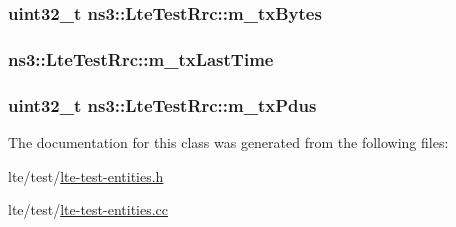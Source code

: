 \subsubsection[{\texorpdfstring{m\+\_\+tx\+Bytes}{m_txBytes}}]{\setlength{\rightskip}{0pt plus 5cm}uint32\+\_\+t ns3\+::\+Lte\+Test\+Rrc\+::m\+\_\+tx\+Bytes\hspace{0.3cm}{\ttfamily [private]}}\hypertarget{classns3_1_1LteTestRrc_a3dc28e3aafa754182994ee88852d4ee3}{}\label{classns3_1_1LteTestRrc_a3dc28e3aafa754182994ee88852d4ee3}
\subsubsection[{\texorpdfstring{m\+\_\+tx\+Last\+Time}{m_txLastTime}}]{ ns3\+::\+Lte\+Test\+Rrc\+::m\+\_\+tx\+Last\+Time\hspace{0.3cm}{\ttfamily [private]}}\hypertarget{classns3_1_1LteTestRrc_a55899e82de707f5b72fad6e982135c21}{}\label{classns3_1_1LteTestRrc_a55899e82de707f5b72fad6e982135c21}
\subsubsection[{\texorpdfstring{m\+\_\+tx\+Pdus}{m_txPdus}}]{\setlength{\rightskip}{0pt plus 5cm}uint32\+\_\+t ns3\+::\+Lte\+Test\+Rrc\+::m\+\_\+tx\+Pdus\hspace{0.3cm}{\ttfamily [private]}}\hypertarget{classns3_1_1LteTestRrc_a6ce0dee0deab77c0e0e1f0639d3b5804}{}\label{classns3_1_1LteTestRrc_a6ce0dee0deab77c0e0e1f0639d3b5804}


The documentation for this class was generated from the following files\+:\begin{DoxyCompactItemize}
\item 
lte/test/\hyperlink{lte-test-entities_8h}{lte-\/test-\/entities.\+h}\item 
lte/test/\hyperlink{lte-test-entities_8cc}{lte-\/test-\/entities.\+cc}\end{DoxyCompactItemize}
